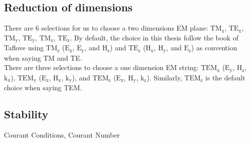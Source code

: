 \subsection{Reduction of dimensions}

There are 6 selections for us to choose a two dimensions EM plane: $\mathrm{TM_{x}} $, $\mathrm{TE_{x}}$,
$\mathrm{TM_{y}}$, $\mathrm{TE_{y}}$, $\mathrm{TM_{z}}$, $\mathrm{TE_{z}}$. By default, the choice in this thesis follow
the book of Taflove using $\mathrm{TM_{z}}$ ($\mathrm{E_x}$, $\mathrm{E_y}$, and $\mathrm{H_z}$) and $\mathrm{TE_{z}}$
($\mathrm{H_x}$, $\mathrm{H_y}$, and $\mathrm{E_z}$) as convention when saying TM and TE.\\

There are three selections to choose a one dimension EM string: $\mathrm{TEM_x}$ ($\mathrm{E_{y}}$, $\mathrm{H_{z}}$,
$\mathrm{k_x}$), $\mathrm{TEM_y}$ ($\mathrm{E_z}$, $\mathrm{H_x}$, $\mathrm{k_y}$), and $\mathrm{TEM_z}$
($\mathrm{E_x}$, $\mathrm{H_y}$, $\mathrm{k_z}$). Similarly, $\mathrm{TEM_z}$ is the default choice when saying TEM.


\subsection{Stability}
Courant Conditions, Courant Number\\

